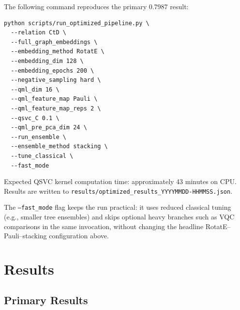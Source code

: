 \documentclass[twocolumn,10pt]{article}
\begin{document}
The following command reproduces the primary 0.7987 result:

\begin{verbatim}
python scripts/run_optimized_pipeline.py \
  --relation CtD \
  --full_graph_embeddings \
  --embedding_method RotatE \
  --embedding_dim 128 \
  --embedding_epochs 200 \
  --negative_sampling hard \
  --qml_dim 16 \
  --qml_feature_map Pauli \
  --qml_feature_map_reps 2 \
  --qsvc_C 0.1 \
  --qml_pre_pca_dim 24 \
  --run_ensemble \
  --ensemble_method stacking \
  --tune_classical \
  --fast_mode
\end{verbatim}

Expected QSVC kernel computation time: approximately 43 minutes on CPU. Results are written to \texttt{results/optimized\_results\_YYYYMMDD-HHMMSS.json}.

The \texttt{--fast\_mode} flag keeps the run practical: it uses reduced classical tuning (e.g., smaller tree ensembles) and skips optional heavy branches such as VQC comparisons in the same invocation, without changing the headline RotatE--Pauli--stacking configuration above.

\section{Results}

\subsection{Primary Results}
\end{document}
